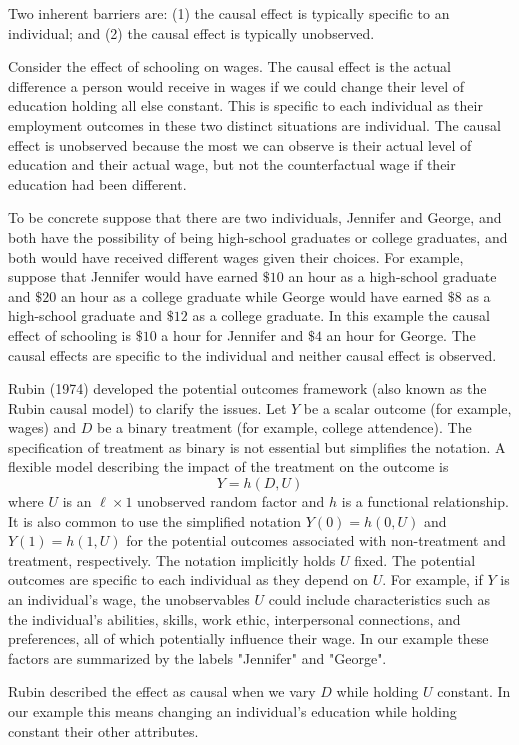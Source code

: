 \documentclass[10pt]{article}
\begin{document}
Two inherent barriers are: (1) the causal effect is typically specific to an individual; and (2) the causal effect is typically unobserved.

Consider the effect of schooling on wages. The causal effect is the actual difference a person would receive in wages if we could change their level of education holding all else constant. This is specific to each individual as their employment outcomes in these two distinct situations are individual. The causal effect is unobserved because the most we can observe is their actual level of education and their actual wage, but not the counterfactual wage if their education had been different.

To be concrete suppose that there are two individuals, Jennifer and George, and both have the possibility of being high-school graduates or college graduates, and both would have received different wages given their choices. For example, suppose that Jennifer would have earned $\$ 10$ an hour as a high-school graduate and $\$ 20$ an hour as a college graduate while George would have earned $\$ 8$ as a high-school graduate and $\$ 12$ as a college graduate. In this example the causal effect of schooling is $\$ 10$ a hour for Jennifer and $\$ 4$ an hour for George. The causal effects are specific to the individual and neither causal effect is observed.

Rubin (1974) developed the potential outcomes framework (also known as the Rubin causal model) to clarify the issues. Let $Y$ be a scalar outcome (for example, wages) and $D$ be a binary treatment (for example, college attendence). The specification of treatment as binary is not essential but simplifies the notation. A flexible model describing the impact of the treatment on the outcome is
$$
Y=h(D, U)
$$
where $U$ is an $\ell \times 1$ unobserved random factor and $h$ is a functional relationship. It is also common to use the simplified notation $Y(0)=h(0, U)$ and $Y(1)=h(1, U)$ for the potential outcomes associated with non-treatment and treatment, respectively. The notation implicitly holds $U$ fixed. The potential outcomes are specific to each individual as they depend on $U$. For example, if $Y$ is an individual's wage, the unobservables $U$ could include characteristics such as the individual's abilities, skills, work ethic, interpersonal connections, and preferences, all of which potentially influence their wage. In our example these factors are summarized by the labels "Jennifer" and "George".

Rubin described the effect as causal when we vary $D$ while holding $U$ constant. In our example this means changing an individual's education while holding constant their other attributes.
\end{document}
